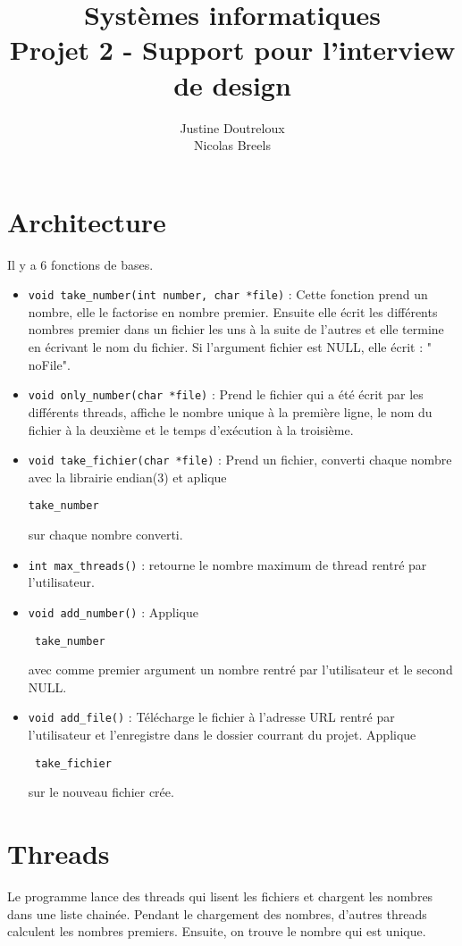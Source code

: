 \documentclass[11pt,a4paper]{article}
\author{Justine Doutreloux \\
Nicolas Breels}
\title{Systèmes informatiques\\
Projet 2 - Support pour l'interview de design}
\begin{document}
\maketitle
\section{Architecture}
Il y a 6 fonctions de bases.
\begin{itemize}
\item \lstinline|void take_number(int number, char *file)| : Cette fonction prend un nombre, elle le factorise en nombre premier. Ensuite elle écrit les différents nombres premier dans un fichier les uns à la suite de l'autres et elle termine en écrivant le nom du fichier. Si l'argument fichier est NULL, elle écrit : " noFile".

\item \lstinline|void only_number(char *file)| : Prend le fichier qui a été écrit par les différents threads, affiche le nombre unique à la première ligne, le nom du fichier à la deuxième et le temps d'exécution à la troisième.

\item \lstinline|void take_fichier(char *file)| : Prend un fichier, converti chaque nombre avec la librairie endian(3) et aplique \begin{verbatim}take_number \end{verbatim} sur chaque nombre converti.

\item \lstinline|int max_threads()| : retourne le nombre maximum de thread rentré par l'utilisateur.

\item \lstinline|void add_number()| : Applique \begin{verbatim} take_number \end{verbatim} avec comme premier argument un nombre rentré par l'utilisateur et le second NULL.

\item \lstinline|void add_file()| : Télécharge le fichier à l'adresse URL rentré par l'utilisateur et l'enregistre dans le dossier courrant du projet. Applique \begin{verbatim} take_fichier \end{verbatim} sur le nouveau fichier crée.
\end{itemize}
\section{Threads}
Le programme lance des threads qui lisent les fichiers et chargent les nombres dans une liste chainée. Pendant le chargement des nombres, d'autres threads calculent les nombres premiers. Ensuite, on trouve le nombre qui est unique.
\end{document}
